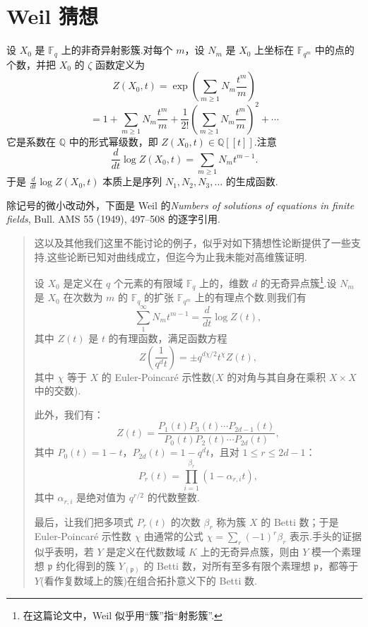 ﻿%
\chapter{Weil 猜想}\label{sec:26}

设 $X_0$ 是 $\mathbb{F}_q$ 上的非奇异射影簇.对每个 $m$，设 $N_m$ 是 $X_0$ 上坐标在 $\mathbb{F}_{q^m}$ 中的点的个数，并把 $X_0$ 的 $\zeta$ 函数定义为
\[
Z(X_0, t) = \exp\left( \sum_{m \geq 1} N_m \frac{t^{m}}{m} \right)
\]
\[
= 1 + \sum_{m \geq 1} N_m \frac{t^{m}}{m} + \frac{1}{2!}\left( \sum_{m \geq 1} N_m \frac{t^{m}}{m} \right)^{2} + \cdots
\]
它是系数在 $\mathbb{Q}$ 中的形式幂级数，即 $Z(X_0, t) \in \mathbb{Q}[[t]]$.注意
\[
\frac{d}{dt} \log Z(X_0, t) = \sum_{m \geq 1} N_m t^{m-1}.
\]
于是 $\frac{d}{dt} \log Z(X_0, t)$ 本质上是序列 $N_1, N_2, N_3, \ldots$ 的生成函数.

除记号的微小改动外，下面是 Weil 的\emph{Numbers of solutions of equations in finite fields}, Bull. AMS 55 (1949), 497--508 的逐字引用.

\begin{quote}
这以及其他我们这里不能讨论的例子，似乎对如下猜想性论断提供了一些支持.这些论断已知对曲线成立，但迄今为止我未能对高维簇证明.

设 $X_0$ 是定义在 $q$ 个元素的有限域 $\mathbb{F}_q$ 上的，维数 $d$ 的无奇异点簇\footnote{在这篇论文中，Weil 似乎用``簇''指``射影簇''.}.设 $N_m$ 是 $X_0$ 在次数为 $m$ 的 $\mathbb{F}_q$ 的扩张 $\mathbb{F}_{q^m}$ 上的有理点个数.则我们有
\[
\sum_{1}^{\infty} N_m t^{m-1} = \frac{d}{dt} \log Z(t),
\]
其中 $Z(t)$ 是 $t$ 的有理函数，满足函数方程
\[
Z\left( \frac{1}{q^{d}t} \right) = \pm q^{d\chi/2} t^{\chi} Z(t),
\]
其中 $\chi$ 等于 $X$ 的 Euler-Poincar\'e 示性数($X$ 的对角与其自身在乘积 $X \times X$ 中的交数).

此外，我们有：
\[
Z(t) = \frac{P_1(t)P_3(t) \cdots P_{2d-1}(t)}{P_0(t)P_2(t) \cdots P_{2d}(t)},
\]
其中 $P_0(t) = 1 - t$，$P_{2d}(t) = 1 - q^{d}t$，且对 $1 \leq r \leq 2d - 1$：
\[
P_r(t) = \prod_{i=1}^{\beta_r} (1 - \alpha_{r,i} t),
\]
其中 $\alpha_{r,i}$ 是绝对值为 $q^{r/2}$ 的代数整数.

最后，让我们把多项式 $P_r(t)$ 的次数 $\beta_r$ 称为簇 $X$ 的 Betti 数；于是 Euler-Poincar\'e 示性数 $\chi$ 由通常的公式 $\chi = \sum_r (-1)^{r}\beta_r$ 表示.手头的证据似乎表明，若 $Y$ 是定义在代数数域 $K$ 上的无奇异点簇，则由 $Y$ 模一个素理想 $\mathfrak{p}$ 约化得到的簇 $Y_{(\mathfrak{p})}$ 的 Betti 数，对所有至多有限个素理想 $\mathfrak{p}$，都等于 $Y$(看作复数域上的簇)在组合拓扑意义下的 Betti 数.
\end{quote}

